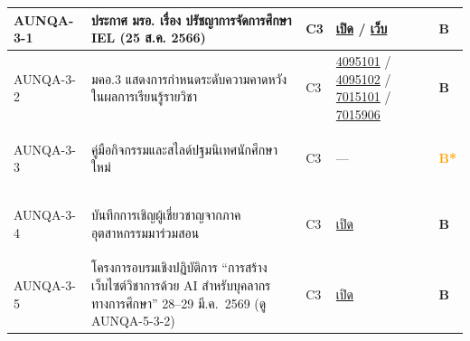 \begin{longtable}{|>{\raggedright\arraybackslash}p{2.3cm}|>{\raggedright\arraybackslash}p{6.5cm}|>{\centering\arraybackslash}p{1.1cm}|>{\raggedright\arraybackslash}p{3.4cm}|>{\centering\arraybackslash}p{0.8cm}|}
  \hypertarget{ref:AUNQA-3-1}{AUNQA-3-1} & ประกาศ มรอ. เรื่อง ปรัชญาการจัดการศึกษา IEL (25 ส.ค. 2566) & C3 & \href{https://syweb.kidcbc.work/Eviden_aunqa68/\%E0\%B8\%A3\%E0\%B8\%B0\%E0\%B9\%80\%E0\%B8\%9A\%E0\%B8\%B5\%E0\%B8\%A2\%E0\%B8\%9A\%E0\%B8\%82\%E0\%B9\%89\%E0\%B8\%AD\%E0\%B8\%9A\%E0\%B8\%B1\%E0\%B8\%87\%E0\%B8\%84\%E0\%B8\%B1\%E0\%B8\%9A\%E0\%B9\%81\%E0\%B8\%A5\%E0\%B8\%B0\%E0\%B8\%9B\%E0\%B8\%A3\%E0\%B8\%B0\%E0\%B8\%81\%E0\%B8\%B2\%E0\%B8\%A8\%E0\%B8\%AD\%E0\%B8\%B7\%E0\%B9\%88\%E0\%B8\%99\%E0\%B9\%86/AUNQA-3-1_\%E0\%B8\%9B\%E0\%B8\%A3\%E0\%B8\%B0\%E0\%B8\%81\%E0\%B8\%B2\%E0\%B8\%A8IEL_2566.pdf}{เปิด} / \href{https://syweb.kidcbc.work}{เว็บ} & \textcolor{blue!70!black}{\textbf{B}} \\
  \hline
  \hypertarget{ref:AUNQA-3-2}{AUNQA-3-2} & มคอ.3 แสดงการกำหนดระดับความคาดหวังในผลการเรียนรู้รายวิชา & C3 & \href{https://syweb.kidcbc.work/Eviden_aunqa68/\%E0\%B8\%A1\%E0\%B8\%84\%E0\%B8\%AD3/AUN3_4095101.pdf}{4095101} / \href{https://syweb.kidcbc.work/Eviden_aunqa68/\%E0\%B8\%A1\%E0\%B8\%84\%E0\%B8\%AD3/AUN3_4095102.pdf}{4095102} / \href{https://syweb.kidcbc.work/Eviden_aunqa68/\%E0\%B8\%A1\%E0\%B8\%84\%E0\%B8\%AD3/AUN3_7015101.pdf}{7015101} / \href{https://syweb.kidcbc.work/Eviden_aunqa68/\%E0\%B8\%A1\%E0\%B8\%84\%E0\%B8\%AD3/AUN3_7015906.pdf}{7015906} & \textcolor{blue!70!black}{\textbf{B}} \\
  \hline
  \hypertarget{ref:AUNQA-3-3}{AUNQA-3-3} & คู่มือกิจกรรมและสไลด์ปฐมนิเทศนักศึกษาใหม่ & C3 & — & \textcolor{orange}{\textbf{B*}} \\
  \hline
  \hypertarget{ref:AUNQA-3-4}{AUNQA-3-4} & บันทึกการเชิญผู้เชี่ยวชาญจากภาคอุตสาหกรรมมาร่วมสอน & C3 & \href{https://academic.uru.ac.th/document/02898.pdf}{เปิด} & \textcolor{blue!70!black}{\textbf{B}} \\
  \hline
  \hypertarget{ref:AUNQA-3-5}{AUNQA-3-5} & โครงการอบรมเชิงปฏิบัติการ ``การสร้างเว็บไซต์วิชาการด้วย AI สำหรับบุคลากรทางการศึกษา'' 28--29 มี.ค.~2569 (ดู AUNQA-5-3-2) & C3 & \href{https://syweb.kidcbc.work/Eviden_aunqa68/\%E0\%B8\%AB\%E0\%B8\%A5\%E0\%B8\%B1\%E0\%B8\%81\%E0\%B8\%90\%E0\%B8\%B2\%E0\%B8\%99\%E0\%B8\%81\%E0\%B8\%B2\%E0\%B8\%A3\%E0\%B8\%9B\%E0\%B8\%A3\%E0\%B8\%B0\%E0\%B8\%8A\%E0\%B8\%B8\%E0\%B8\%A1/01_\%E0\%B8\%A3\%E0\%B8\%B0\%E0\%B8\%94\%E0\%B8\%B1\%E0\%B8\%9A\%E0\%B8\%AB\%E0\%B8\%A5\%E0\%B8\%B1\%E0\%B8\%81\%E0\%B8\%AA\%E0\%B8\%B9\%E0\%B8\%95\%E0\%B8\%A3/AUNQA-5-3-2_\%E0\%B9\%82\%E0\%B8\%84\%E0\%B8\%A3\%E0\%B8\%87\%E0\%B8\%81\%E0\%B8\%B2\%E0\%B8\%A3\%E0\%B8\%AD\%E0\%B8\%9A\%E0\%B8\%A3\%E0\%B8\%A1_AI_\%E0\%B9\%80\%E0\%B8\%A7\%E0\%B9\%87\%E0\%B8\%9A\%E0\%B8\%A7\%E0\%B8\%B4\%E0\%B8\%8A\%E0\%B8\%B2\%E0\%B8\%81\%E0\%B8\%B2\%E0\%B8\%A3_2569-03-28.pdf}{เปิด} & \textcolor{blue!70!black}{\textbf{B}} \\

\end{longtable}
